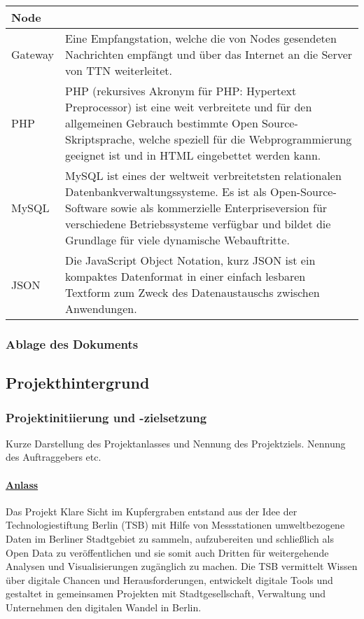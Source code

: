 \begin{table}[H]
\begin{tabularx}{\textwidth}{ |l|X| }
		\hline
		Node &  \\
		\hline
		Gateway & Eine Empfangstation, welche die von Nodes gesendeten Nachrichten empfängt und über das Internet an die Server von TTN weiterleitet. \\
		\hline
		PHP & PHP (rekursives Akronym für PHP: Hypertext Preprocessor) ist eine weit
			  verbreitete und für den allgemeinen Gebrauch bestimmte
			  Open Source-Skriptsprache, welche speziell für die Webprogrammierung
			  geeignet ist und in HTML eingebettet werden kann. \\
		\hline
		MySQL & MySQL ist eines der weltweit verbreitetsten relationalen
				Datenbankverwaltungssysteme. Es ist als Open-Source-Software sowie
				als kommerzielle Enterpriseversion für verschiedene Betriebssysteme
				verfügbar und bildet die Grundlage für viele dynamische Webauftritte. \\
		\hline
		JSON & Die JavaScript Object Notation, kurz JSON ist ein kompaktes Datenformat
			   in einer einfach lesbaren Textform zum Zweck des Datenaustauschs zwischen
			   Anwendungen. \\
		\hline
	\end{tabularx}
\end{table}

\subsubsection{Ablage des Dokuments}

\subsection{Projekthintergrund}

\subsubsection{Projektinitiierung und -zielsetzung}

\begin{itshape}
	Kurze Darstellung des Projektanlasses und Nennung des Projektziels.
	Nennung des Auftraggebers etc.
\end{itshape}

\paragraph{\uline{Anlass}}
Das Projekt \glqq Klare Sicht im Kupfergraben\grqq{} entstand aus der Idee der Technologiestiftung Berlin (TSB) mit Hilfe von Messstationen umweltbezogene Daten im Berliner Stadtgebiet zu sammeln, aufzubereiten und schließlich als \glqq Open Data\grqq{} zu veröffentlichen und sie somit auch Dritten für weitergehende Analysen und Visualisierungen zugänglich zu machen.
Die TSB vermittelt Wissen über digitale Chancen und Herausforderungen, entwickelt digitale Tools und gestaltet in gemeinsamen Projekten mit Stadtgesellschaft, Verwaltung und Unternehmen den digitalen Wandel in Berlin.

